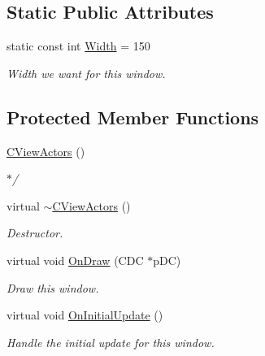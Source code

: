 \subsection*{Static Public Attributes}
\begin{DoxyCompactItemize}
\item 
\hypertarget{class_c_view_actors_a8bb27cbe8ae099abbed012adca884f1f}{static const int \hyperlink{class_c_view_actors_a8bb27cbe8ae099abbed012adca884f1f}{Width} = 150}\label{class_c_view_actors_a8bb27cbe8ae099abbed012adca884f1f}

\begin{DoxyCompactList}\small\item\em Width we want for this window. \end{DoxyCompactList}\end{DoxyCompactItemize}
\subsection*{Protected Member Functions}
\begin{DoxyCompactItemize}
\item 
\hyperlink{class_c_view_actors_aeff00d958ecea52760ec07c0420c4e28}{C\+View\+Actors} ()
\begin{DoxyCompactList}\small\item\em $\ast$/ \end{DoxyCompactList}\item 
\hypertarget{class_c_view_actors_a6e1aa1c82708dd805ac90c21b6d521e0}{virtual \hyperlink{class_c_view_actors_a6e1aa1c82708dd805ac90c21b6d521e0}{$\sim$\+C\+View\+Actors} ()}\label{class_c_view_actors_a6e1aa1c82708dd805ac90c21b6d521e0}

\begin{DoxyCompactList}\small\item\em Destructor. \end{DoxyCompactList}\item 
virtual void \hyperlink{class_c_view_actors_aa68465c2f13e487426508832a6355503}{On\+Draw} (C\+D\+C $\ast$p\+D\+C)
\begin{DoxyCompactList}\small\item\em Draw this window. \end{DoxyCompactList}\item 
\hypertarget{class_c_view_actors_aaf83b3647a42330c01be9067a6235d33}{virtual void \hyperlink{class_c_view_actors_aaf83b3647a42330c01be9067a6235d33}{On\+Initial\+Update} ()}\label{class_c_view_actors_aaf83b3647a42330c01be9067a6235d33}

\begin{DoxyCompactList}\small\item\em Handle the initial update for this window. \end{DoxyCompactList}\end{DoxyCompactItemize}


